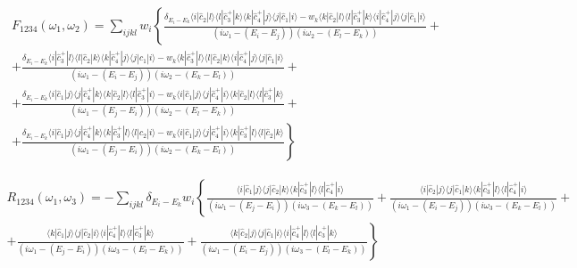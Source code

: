 \documentclass{article}
\newcommand{\melem}[3]{\langle#1|#2|#3\rangle}
\begin{document}
\begin{eqnarray*}
    F_{1234}(\omega_1,\omega_2) = \sum_{ijkl} w_i
        \left\{
            \frac{\delta_{E_i - E_k}\melem{i}{\hat c_2}{l}\melem{l}{\hat c^+_3}{k}\melem{k}{\hat c^+_4}{j}\melem{j}{\hat c_1}{i}
                    - w_k \melem{k}{\hat c_2}{l}\melem{l}{\hat c^+_3}{k}\melem{i}{\hat c^+_4}{j}\melem{j}{\hat c_1}{i}
                }
                {(i\omega_1-(E_i-E_j))(i\omega_2-(E_l-E_k))} \right. +\\+ \left.
            \frac{\delta_{E_i - E_k}\melem{i}{\hat c^+_3}{l}\melem{l}{\hat c_2}{k}\melem{k}{\hat c^+_4}{j}\melem{j}{\hat c_1}{i}
                    - w_k \melem{k}{\hat c^+_3}{l}\melem{l}{\hat c_2}{k}\melem{i}{\hat c^+_4}{j}\melem{j}{\hat c_1}{i}
                }
                {(i\omega_1-(E_i-E_j))(i\omega_2-(E_k-E_l))} \right. +\\+ \left.
            \frac{\delta_{E_i - E_k}\melem{i}{\hat c_1}{j}\melem{j}{\hat c^+_4}{k}\melem{k}{\hat c_2}{l}\melem{l}{\hat c^+_3}{i}
                    - w_k \melem{i}{\hat c_1}{j}\melem{j}{\hat c^+_4}{i}\melem{k}{\hat c_2}{l}\melem{l}{\hat c^+_3}{k}
                }
                {(i\omega_1-(E_j-E_i))(i\omega_2-(E_l-E_k))} \right. +\\+ \left.
            \frac{\delta_{E_i - E_k}\melem{i}{\hat c_1}{j}\melem{j}{\hat c^+_4}{k}\melem{k}{\hat c^+_3}{l}\melem{l}{\hat c_2}{i}
                    - w_k \melem{i}{\hat c_1}{j}\melem{j}{\hat c^+_4}{i}\melem{k}{\hat c^+_3}{l}\melem{l}{\hat c_2}{k}
                }
                {(i\omega_1-(E_j-E_i))(i\omega_2-(E_k-E_l))}
        \right\}
\end{eqnarray*}

\begin{eqnarray*}
    R_{1234}(\omega_1,\omega_3) = -\sum_{ijkl}\delta_{E_i - E_k} w_i
        \left\{
            \frac{\melem{i}{\hat c_1}{j}\melem{j}{\hat c_2}{k}\melem{k}{\hat c^+_3}{l}\melem{l}{\hat c^+_4}{i}}
                {(i\omega_1-(E_j-E_i))(i\omega_3-(E_k-E_l))}
          + \frac{\melem{i}{\hat c_2}{j}\melem{j}{\hat c_1}{k}\melem{k}{\hat c^+_3}{l}\melem{l}{\hat c^+_4}{i}}
                {(i\omega_1-(E_i-E_j))(i\omega_3-(E_k-E_l))} \right. +\\+ \left.
            \frac{\melem{k}{\hat c_1}{j}\melem{j}{\hat c_2}{i}\melem{i}{\hat c^+_4}{l}\melem{l}{\hat c^+_3}{k}}
                {(i\omega_1-(E_j-E_i))(i\omega_3-(E_l-E_k))}
          + \frac{\melem{k}{\hat c_2}{j}\melem{j}{\hat c_1}{i}\melem{i}{\hat c^+_4}{l}\melem{l}{\hat c^+_3}{k}}
                {(i\omega_1-(E_i-E_j))(i\omega_3-(E_l-E_k))}
        \right\}
\end{eqnarray*}    
\end{document}

